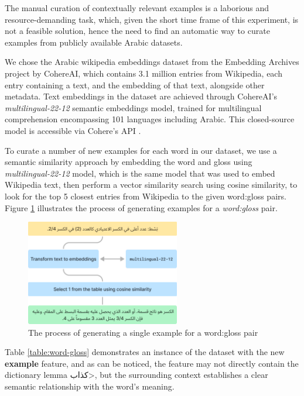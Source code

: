 \documentclass[12.5pt]{article}
\begin{document}
The manual curation of contextually relevant examples is a laborious and resource-demanding task, which, given the short time frame of this experiment, is not a feasible solution, hence the need to find an automatic way to curate examples from publicly available Arabic datasets.

We chose the Arabic wikipedia embeddings dataset from the Embedding Archives project by CohereAI, which contains 3.1 million entries from Wikipedia, each entry containing a text, and the embedding of that text, alongside other metadata. Text embeddings in the dataset are achieved through CohereAI's \textit{multilingual-22-12} semantic embeddings model, trained for multilingual comprehension encompassing 101 languages including Arabic. This closed-source model is accessible via Cohere's API \cite{Kamalloo2023}.

To curate a number of new examples for each word in our dataset, we use a semantic similarity approach by embedding the word and gloss using \textit{multilingual-22-12} model, which is the same model that was used to embed Wikipedia text, then perform a vector similarity search using cosine similarity, to look for the top 5 closest entries from Wikipedia to the given word:gloss pairs. Figure \ref{fig:examples-generation} illustrates the process of generating examples for a \textit{word:gloss} pair.

\begin{figure}[H]
    \centering
    \captionsetup{justification=centering}
    \includegraphics[width=0.6\textwidth]{examples-generation.png}
    \caption{The process of generating a single example for a word:gloss pair}
    \label{fig:examples-generation}
\end{figure}

Table \ref{table:word-gloss} demonstrates an instance of the dataset with the new \textbf{example} feature, and as can be noticed, the feature may not directly contain the dictionary lemma \<كذاب>, but the surrounding context establishes a clear semantic relationship with the word's meaning.
\end{document}
